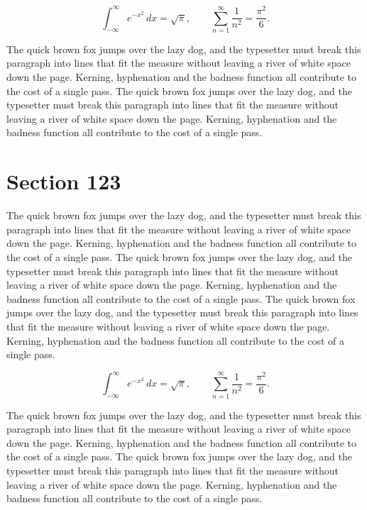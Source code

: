 \documentclass{article}
\begin{document}
\begin{equation}
\int_{-\infty}^{\infty} e^{-x^{2}}\,dx = \sqrt{\pi}, \qquad
\sum_{n=1}^{\infty} \frac{1}{n^{2}} = \frac{\pi^{2}}{6}.
\end{equation}

The quick brown fox jumps over the lazy dog, and the typesetter must break this paragraph into lines that fit the measure without leaving a river of white space down the page. Kerning, hyphenation and the badness function all contribute to the cost of a single pass. The quick brown fox jumps over the lazy dog, and the typesetter must break this paragraph into lines that fit the measure without leaving a river of white space down the page. Kerning, hyphenation and the badness function all contribute to the cost of a single pass. 
\section{Section 123}
The quick brown fox jumps over the lazy dog, and the typesetter must break this paragraph into lines that fit the measure without leaving a river of white space down the page. Kerning, hyphenation and the badness function all contribute to the cost of a single pass. The quick brown fox jumps over the lazy dog, and the typesetter must break this paragraph into lines that fit the measure without leaving a river of white space down the page. Kerning, hyphenation and the badness function all contribute to the cost of a single pass. The quick brown fox jumps over the lazy dog, and the typesetter must break this paragraph into lines that fit the measure without leaving a river of white space down the page. Kerning, hyphenation and the badness function all contribute to the cost of a single pass. 

\begin{equation}
\int_{-\infty}^{\infty} e^{-x^{2}}\,dx = \sqrt{\pi}, \qquad
\sum_{n=1}^{\infty} \frac{1}{n^{2}} = \frac{\pi^{2}}{6}.
\end{equation}

The quick brown fox jumps over the lazy dog, and the typesetter must break this paragraph into lines that fit the measure without leaving a river of white space down the page. Kerning, hyphenation and the badness function all contribute to the cost of a single pass. The quick brown fox jumps over the lazy dog, and the typesetter must break this paragraph into lines that fit the measure without leaving a river of white space down the page. Kerning, hyphenation and the badness function all contribute to the cost of a single pass. 
\end{document}
